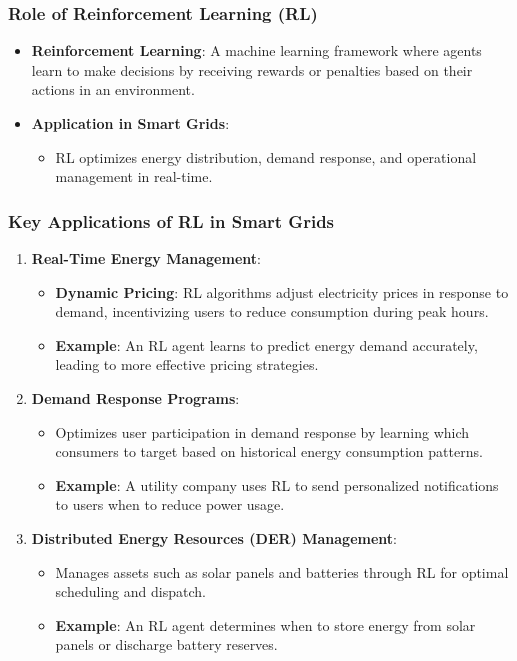 \documentclass[aspectratio=169]{beamer}
\begin{document}
\begin{frame}[fragile]
  \frametitle{Role of Reinforcement Learning (RL)}
  \begin{itemize}
    \item \textbf{Reinforcement Learning}: A machine learning framework where agents learn to make decisions by receiving rewards or penalties based on their actions in an environment.
    \item \textbf{Application in Smart Grids}: 
      \begin{itemize}
        \item RL optimizes energy distribution, demand response, and operational management in real-time.
      \end{itemize}
  \end{itemize}
\end{frame}

\begin{frame}[fragile]
  \frametitle{Key Applications of RL in Smart Grids}
  \begin{enumerate}
    \item \textbf{Real-Time Energy Management}:
      \begin{itemize}
        \item \textbf{Dynamic Pricing}: RL algorithms adjust electricity prices in response to demand, incentivizing users to reduce consumption during peak hours.
        \item \textbf{Example}: An RL agent learns to predict energy demand accurately, leading to more effective pricing strategies.
      \end{itemize}
  
    \item \textbf{Demand Response Programs}:
      \begin{itemize}
        \item Optimizes user participation in demand response by learning which consumers to target based on historical energy consumption patterns.
        \item \textbf{Example}: A utility company uses RL to send personalized notifications to users when to reduce power usage.
      \end{itemize}
  
    \item \textbf{Distributed Energy Resources (DER) Management}:
      \begin{itemize}
        \item Manages assets such as solar panels and batteries through RL for optimal scheduling and dispatch.
        \item \textbf{Example}: An RL agent determines when to store energy from solar panels or discharge battery reserves.
      \end{itemize}
  \end{enumerate}
\end{frame}
\end{document}
